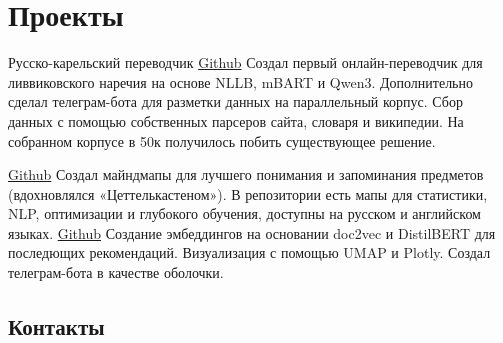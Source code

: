 \documentclass[12pt,a4paper,sans]{moderncv}
\begin{document}





\section{Проекты}
\cvline
{Русско-карельский переводчик}
{\href{https://github.com/breadfan/kielven_project}{Github}\newline{}
	Создал первый онлайн-переводчик для ливвиковского наречия на основе NLLB, mBART и Qwen3. Дополнительно сделал телеграм-бота для разметки данных на параллельный корпус. Сбор данных с помощью собственных парсеров сайта, словаря и википедии. На собранном корпусе в 50к получилось побить существующее решение.
	}

  {\href{https://github.com/breadfan/mindmaps-for-everything}{Github}\newline{}
  	Создал майндмапы для лучшего понимания и запоминания предметов (вдохновлялся «Цеттелькастеном»). В репозитории есть мапы для статистики, NLP, оптимизации и глубокого обучения, доступны на русском и английском языках.
  }
  {\href{https://github.com/breadfan/lyrics-based-songs-recommender}{Github}
  	\newline{}
  	Создание эмбеддингов на основании doc2vec и DistilBERT для последющих рекомендаций. Визуализация с помощью UMAP и Plotly. Создал телеграм-бота в качестве оболочки.}
 

  
  	
  






 \subsection{Контакты}
    
\end{document}
